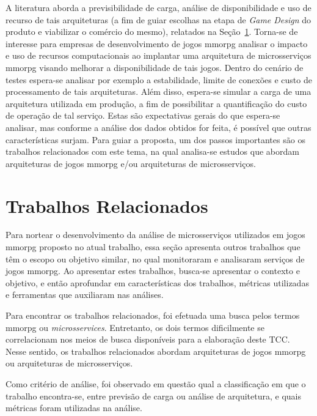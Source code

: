 A literatura aborda a previsibilidade de carga, análise de disponibilidade e uso de recurso de tais arquiteturas (a fim de guiar escolhas na etapa de \textit{Game Design} do produto e viabilizar o comércio do mesmo), relatados na Seção~\ref{sec:similares}.
%
Torna-se de interesse para empresas de desenvolvimento de jogos \ac{mmorpg} analisar o impacto e uso de recursos computacionais ao implantar uma arquitetura de microsserviços \ac{mmorpg} visando melhorar a disponibilidade de tais jogos.
%
Dentro do cenário de testes espera-se analisar por exemplo a estabilidade, limite de conexões e custo de processamento de tais arquiteturas.
%
Além disso, espera-se simular a carga de uma arquitetura utilizada em produção, a fim de possibilitar a quantificação do custo de operação de tal serviço.
%
Estas são expectativas gerais do que espera-se analisar, mas conforme a análise dos dados obtidos for feita, é possível que outras características surjam.
%
Para guiar a proposta, um dos passos importantes são os trabalhos relacionados com este tema, na qual analisa-se estudos que abordam arquiteturas de jogos \ac{mmorpg} e/ou arquiteturas de microsserviços.



\section{Trabalhos Relacionados}
\label{sec:similares}



Para nortear o desenvolvimento da análise de microsserviços utilizados em jogos \ac{mmorpg} proposto no atual trabalho, essa seção apresenta outros trabalhos que têm o escopo ou objetivo similar, no qual monitoraram e analisaram serviços de jogos \ac{mmorpg}.
%
Ao apresentar estes trabalhos, busca-se apresentar o contexto e objetivo, e então aprofundar em características dos trabalhos, métricas utilizadas e ferramentas que auxiliaram nas análises.


Para encontrar os trabalhos relacionados, foi efetuada uma busca pelos termos \ac{mmorpg} ou \textit{microsservices}.
%
Entretanto, os dois termos dificilmente se correlacionam nos meios de busca disponíveis para a elaboração deste TCC.
%
Nesse sentido, os trabalhos relacionados abordam arquiteturas de jogos \ac{mmorpg} ou arquiteturas de microsserviços.



Como critério de análise, foi observado em questão qual a classificação em que o trabalho encontra-se, entre previsão de carga ou análise de arquitetura, e quais métricas foram utilizadas na análise.

